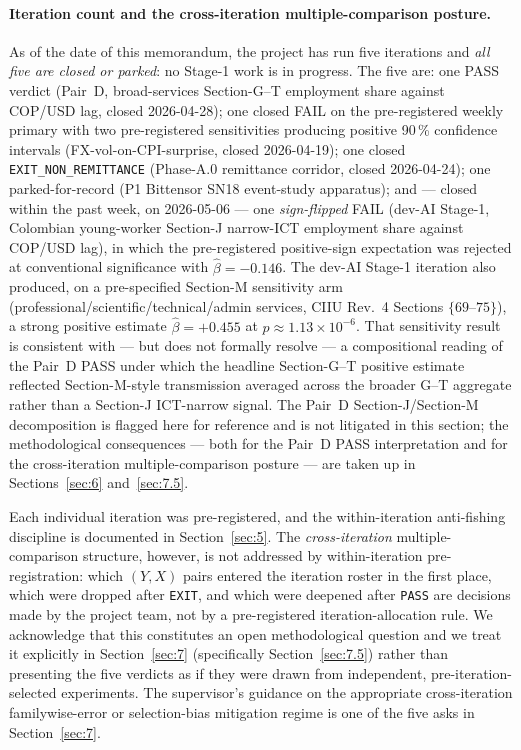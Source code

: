 \paragraph{Iteration count and the cross-iteration multiple-comparison
posture.} As of the date of this memorandum, the project has run five
iterations and \emph{all five are closed or parked}: no Stage-1 work is in
progress. The five are: one PASS verdict (Pair~D, broad-services
Section-G--T employment share against COP/USD lag, closed 2026-04-28); one
closed FAIL on the pre-registered weekly primary with two pre-registered
sensitivities producing positive 90\,\% confidence intervals
(FX-vol-on-CPI-surprise, closed 2026-04-19); one closed
\texttt{EXIT\_NON\_REMITTANCE} (Phase-A.0 remittance corridor, closed
2026-04-24); one parked-for-record (P1 Bittensor SN18 event-study
apparatus); and --- closed within the past week, on 2026-05-06 --- one
\emph{sign-flipped} FAIL (dev-AI Stage-1, Colombian young-worker Section-J
narrow-ICT employment share against COP/USD lag), in which the
pre-registered positive-sign expectation was rejected at conventional
significance with \(\hat{\beta} = -0.146\). The dev-AI Stage-1 iteration
also produced, on a pre-specified Section-M sensitivity arm
(professional/scientific/technical/admin services, CIIU Rev.~4 Sections
\(\{69\text{--}75\}\)), a strong positive estimate
\(\hat{\beta} = +0.455\) at \(p \approx 1.13 \times 10^{-6}\). That
sensitivity result is consistent with --- but does not formally resolve
--- a compositional reading of the Pair~D PASS under which the headline
Section-G--T positive estimate reflected Section-M-style transmission
averaged across the broader G--T aggregate rather than a Section-J
ICT-narrow signal. The Pair~D Section-J/Section-M decomposition is flagged
here for reference and is not litigated in this section; the
methodological consequences --- both for the Pair~D PASS interpretation
and for the cross-iteration multiple-comparison posture --- are taken up
in Sections~\ref{sec:6} and~\ref{sec:7.5}.

Each individual iteration was pre-registered, and the within-iteration
anti-fishing discipline is documented in Section~\ref{sec:5}. The
\emph{cross-iteration} multiple-comparison structure, however, is not
addressed by within-iteration pre-registration: which \((Y, X)\) pairs
entered the iteration roster in the first place, which were dropped after
\texttt{EXIT}, and which were deepened after \texttt{PASS} are decisions
made by the project team, not by a pre-registered iteration-allocation
rule. We acknowledge that this constitutes an open methodological question
and we treat it explicitly in Section~\ref{sec:7} (specifically
Section~\ref{sec:7.5}) rather than presenting the five verdicts as if they
were drawn from independent, pre-iteration-selected experiments. The
supervisor's guidance on the appropriate cross-iteration familywise-error
or selection-bias mitigation regime is one of the five asks in
Section~\ref{sec:7}.

